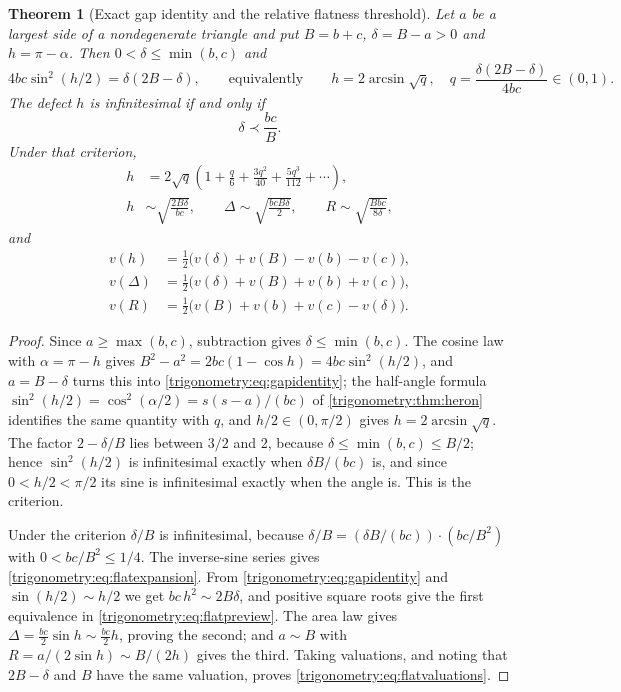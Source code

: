 \documentclass[11pt,letterpaper]{article}
\numberwithin{equation}{section}
\newtheorem{theorem}{Theorem}[section]
\theoremstyle{definition}
\theoremstyle{remark}
\begin{document}
\begin{theorem}[Exact gap identity and the relative flatness threshold]
\label{trigonometry:thm:flatrelative}
Let $a$ be a largest side of a nondegenerate triangle and put $B=b+c$, $\delta=B-a>0$ and
$h=\pi-\alpha$. Then $0<\delta\le\min(b,c)$ and
\begin{equation}\label{trigonometry:eq:gapidentity}
 4bc\sin^2(h/2)=\delta(2B-\delta),
 \qquad\text{equivalently}\qquad
 h=2\arcsin\sqrt q,\quad q=\frac{\delta(2B-\delta)}{4bc}\in(0,1).
\end{equation}
The defect $h$ is infinitesimal \emph{if and only if}
\begin{equation}\label{trigonometry:eq:flatcriterion}
 \delta\prec\frac{bc}B .
\end{equation}
Under that criterion,
\begin{align}
 h&=2\sqrt q\left(1+\frac q6+\frac{3q^2}{40}+\frac{5q^3}{112}+\cdots\right),
 \label{trigonometry:eq:flatexpansion}\\
 h&\sim\sqrt{\frac{2B\delta}{bc}},\qquad
 \Delta\sim\sqrt{\frac{bcB\delta}2},\qquad
 R\sim\sqrt{\frac{Bbc}{8\delta}},\label{trigonometry:eq:flatpreview}
\end{align}
and
\begin{align}
 v(h)&=\tfrac12\bigl(v(\delta)+v(B)-v(b)-v(c)\bigr),\nonumber\\
 v(\Delta)&=\tfrac12\bigl(v(\delta)+v(B)+v(b)+v(c)\bigr),\label{trigonometry:eq:flatvaluations}\\
 v(R)&=\tfrac12\bigl(v(B)+v(b)+v(c)-v(\delta)\bigr).\nonumber
\end{align}
\end{theorem}
\begin{proof}
Since $a\ge\max(b,c)$, subtraction gives $\delta\le\min(b,c)$. The cosine law with $\alpha=\pi-h$
gives $B^2-a^2=2bc(1-\cos h)=4bc\sin^2(h/2)$, and $a=B-\delta$ turns this into
\cref{trigonometry:eq:gapidentity}; the half-angle formula
$\sin^2(h/2)=\cos^2(\alpha/2)=s(s-a)/(bc)$ of \cref{trigonometry:thm:heron} identifies the same
quantity with $q$, and $h/2\in(0,\pi/2)$ gives $h=2\arcsin\sqrt q$. The factor $2-\delta/B$ lies
between $3/2$ and $2$, because $\delta\le\min(b,c)\le B/2$; hence $\sin^2(h/2)$ is infinitesimal
exactly when $\delta B/(bc)$ is, and since $0<h/2<\pi/2$ its sine is infinitesimal exactly when the
angle is. This is the criterion.

Under the criterion $\delta/B$ is infinitesimal, because
$\delta/B=(\delta B/(bc))\cdot(bc/B^2)$ with $0<bc/B^2\le1/4$. The inverse-sine series gives
\cref{trigonometry:eq:flatexpansion}. From \cref{trigonometry:eq:gapidentity} and
$\sin(h/2)\sim h/2$ we get $bc\,h^2\sim2B\delta$, and positive square roots give the first
equivalence in \cref{trigonometry:eq:flatpreview}. The area law gives
$\Delta=\frac{bc}2\sin h\sim\frac{bc}2h$, proving the second; and $a\sim B$ with
$R=a/(2\sin h)\sim B/(2h)$ gives the third. Taking valuations, and noting that $2B-\delta$ and $B$
have the same valuation, proves \cref{trigonometry:eq:flatvaluations}.
\end{proof}
\end{document}
